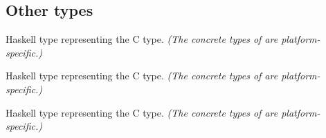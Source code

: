 \subsection{Other types}
\begin{haddockdesc}
\item[\begin{tabular}{@{}l}
data CFile
\end{tabular}]
{\haddockbegindoc
Haskell type representing the C  type.
 \emph{(The concrete types of  are platform-specific.)}\par}
\end{haddockdesc}
\begin{haddockdesc}
\item[\begin{tabular}{@{}l}
data CFpos
\end{tabular}]
{\haddockbegindoc
Haskell type representing the C  type.
 \emph{(The concrete types of  are platform-specific.)}\par}
\end{haddockdesc}
\begin{haddockdesc}
\item[\begin{tabular}{@{}l}
data CJmpBuf
\end{tabular}]
{\haddockbegindoc
Haskell type representing the C  type.
 \emph{(The concrete types of  are platform-specific.)}\par}
\end{haddockdesc}